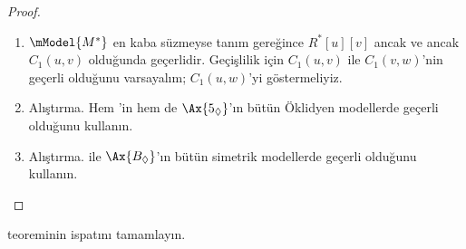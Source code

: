 \begin{proof}
\begin{enumerate}
  \item $\mModel{M^*}$ en kaba süzmeyse tanım gereğince $R^*[u][v]$
    ancak ve ancak $C_1(u,v)$ olduğunda geçerlidir. Geçişlilik için
    $C_1(u,v)$ ile $C_1(v,w)$'nin geçerli olduğunu varsayalım;
    $C_1(u,w)$'yi göstermeliyiz.
  \item Alıştırma. Hem 'in hem de $\Ax{5_\Diamond}$'ın bütün
    Öklidyen modellerde geçerli olduğunu kullanın.
  \item Alıştırma.  ile $\Ax{B_\Diamond}$'ın bütün simetrik
    modellerde geçerli olduğunu kullanın.
\end{enumerate}
\end{proof}

\begin{prob}
   teoreminin ispatını
  tamamlayın.
\end{prob}

